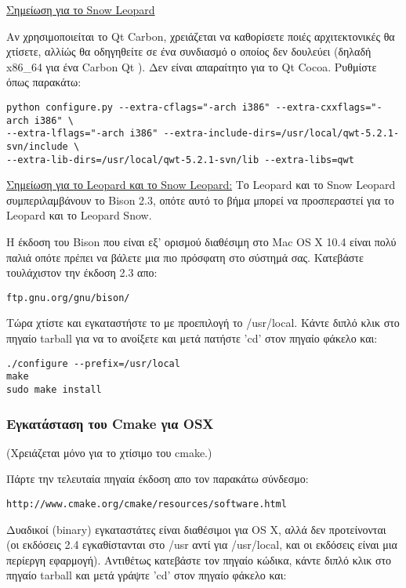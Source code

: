 \underline{Σημείωση για το Snow Leopard}

Αν χρησιμοποιείται το Qt Carbon, χρειάζεται να καθορίσετε ποιές αρχιτεκτονικές θα χτίσετε, αλλίώς θα οδηγηθείτε σε ένα συνδιασμό ο οποίος δεν δουλεύει (δηλαδή x86_64 για ένα Carbon Qt
). Δεν είναι απαραίτητο για το Qt Cocoa. Ρυθμίστε όπως παρακάτω:

\begin{verbatim}
python configure.py --extra-cflags="-arch i386" --extra-cxxflags="-arch i386" \
--extra-lflags="-arch i386" --extra-include-dirs=/usr/local/qwt-5.2.1-svn/include \
--extra-lib-dirs=/usr/local/qwt-5.2.1-svn/lib --extra-libs=qwt
\end{verbatim}

\underline{Σημείωση για το Leopard και το Snow Leopard:} Το Leopard και το Snow Leopard συμπεριλαμβάνουν το Bison 2.3, οπότε αυτό το βήμα μπορεί να προσπεραστεί για το Leopard και το Leopard Snow.

Η έκδοση του Bison που είναι εξ' ορισμού διαθέσιμη στο Mac OS X 10.4 είναι πολύ παλιά οπότε πρέπει να βάλετε μια πιο πρόσφατη στο σύστημά σας. Κατεβάστε τουλάχιστον την έκδοση 2.3 απο:

\begin{verbatim}
ftp.gnu.org/gnu/bison/
\end{verbatim}

Τώρα χτίστε και εγκαταστήστε το με προεπιλογή το /usr/local. Κάντε διπλό κλικ στο πηγαίο tarball για να το ανοίξετε και μετά πατήστε 'cd' στον πηγαίο φάκελο και:

\begin{verbatim}
./configure --prefix=/usr/local 
make
sudo make install 
\end{verbatim}

\hypertarget{toc21}{}
\subsubsection{Εγκατάσταση του Cmake για OSX}
(Χρειάζεται μόνο για το χτίσιμο του cmake.)

Πάρτε την τελευταία πηγαία έκδοση απο τον παρακάτω σύνδεσμο:

\begin{verbatim}
http://www.cmake.org/cmake/resources/software.html
\end{verbatim}

Δυαδικοί (binary) εγκαταστάτες είναι διαθέσιμοι για OS X, αλλά δεν προτείνονται (οι εκδόσεις 2.4  εγκαθίστανται στο /usr αντί για /usr/local, και οι εκδόσεις είναι μια περίεργη εφαρμογή). Αντιθέτως κατεβάστε τον πηγαίο κώδικα, κάντε διπλό κλικ στο πηγαίο tarball και μετά γράψτε 'cd' στον πηγαίο φάκελο και:

